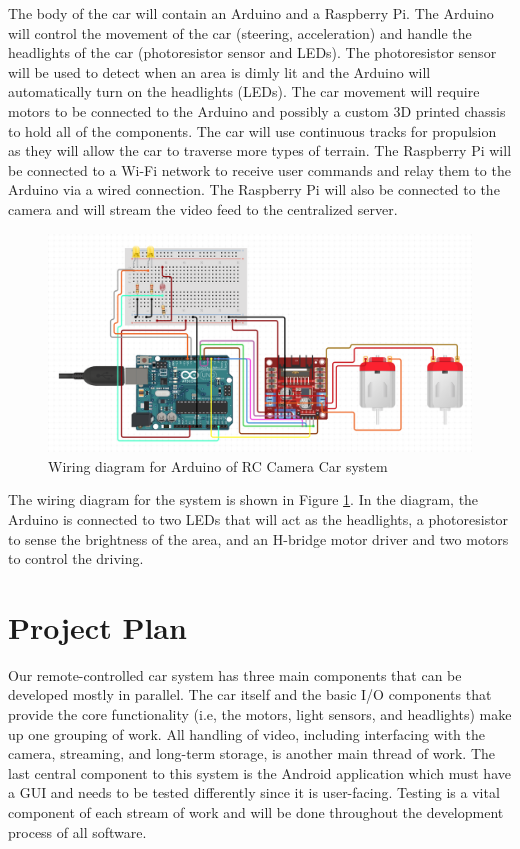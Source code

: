 \documentclass[letterpaper,12pt]{report}
\begin{document}
	The body of the car will contain an Arduino and a Raspberry Pi. The Arduino
	will control the movement of the car (steering, acceleration) and handle the
	headlights of the car (photoresistor sensor and LEDs). The photoresistor
	sensor will be used to detect when an area is dimly lit and the Arduino will
	automatically turn on the headlights (LEDs). The car movement will require
	motors to be connected to the Arduino and possibly a custom 3D printed
	chassis to hold all of the components. The car will use continuous tracks
	for propulsion as they will allow the car to traverse more types of terrain.
	The Raspberry Pi will be connected to a Wi-Fi network to receive user
	commands and relay them to the Arduino via a wired connection. The Raspberry
	Pi will also be connected to the camera and will stream the video feed to
	the centralized server.

	\begin{figure}[H]
    	\centering
		\includegraphics[width=\linewidth]{Proposal_Wiring_Diagram.png}
    	\caption{Wiring diagram for Arduino of RC Camera Car system}
    	\label{fig:wiring}
	\end{figure}

	The wiring diagram for the system is shown in Figure \ref{fig:wiring}. In
	the diagram, the Arduino is connected to two LEDs that will act as the
	headlights, a photoresistor to sense the brightness of the area, and an
	H-bridge motor driver and two motors to control the driving.

	\section*{Project Plan}
	\markright{}
	Our remote-controlled car system has three main components that can be
	developed mostly in parallel. The car itself and the basic I/O components
	that provide the core functionality (i.e, the motors, light sensors, and
	headlights) make up one grouping of work. All handling of video, including
	interfacing with the camera, streaming, and long-term storage, is another
	main thread of work. The last central component to this system is the
	Android application which must have a GUI and needs to be tested differently
	since it is user-facing. Testing is a vital component of each stream of work
	and will be done throughout the development process of all software.
\end{document}

